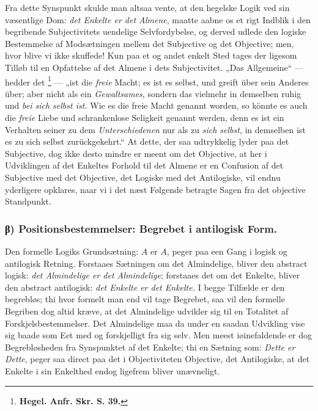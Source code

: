 \documentclass[11pt]{book}
\newcommand{\opage}[1]{\marginnote{\footnotesize\textit{[#1]}}}
\begin{document}
Fra dette Synspunkt skulde man altsaa vente, at den hegelske Logik ved
sin væsentlige Dom: \emph{det Enkelte er det Almene}, maatte aabne os
et rigt Indblik i den begribende Subjectivitets uendelige
Selvfordybelse, og derved udlede den logiske Bestemmelse af
Modsætningen mellem det Subjective og det Objective; men, hvor blive
vi ikke skuffede! Kun paa et og andet enkelt Sted tages der ligesom
Tilløb til en Opfattelse af det Almene i dets Subjectivitet. „Das
Allgemeine“ --- hedder det%
\footnote{%
\textbf{Hegel. Anfr. Skr. S. 39.}} --- „ist die \emph{freie} Macht; es
ist es selbst, und greift über sein Anderes über; aber nicht als ein
\emph{Gewaltsames}, sondern das vielmehr in demselben ruhig und
\emph{bei sich selbst ist.} Wie es die freie Macht genannt worden, so
könnte es auch die \emph{freie} Liebe und schrankenlose Seligkeit
genannt werden, denn es ist ein Verhalten seiner zu dem
\emph{Unterschiedenen} nur als zu \emph{sich selbst}, in demselben ist
es zu sich selbst zurückgekehrt.“ At dette, der saa udtrykkelig lyder
paa det Subjective, dog ikke desto mindre er meent om det Objective,
at her i Udviklingen af det Enkeltes Forhold til det Almene er en
Confusion af det Subjective med det Objective, det Logiske med det
Antilogiske, vil endnu yderligere opklares, naar vi i det næst
Følgende betragte Sagen fra det objective Standpunkt.

\subsubsection*{β) Positionsbestemmelser: Begrebet i antilogisk Form.}

Den formelle Logiks Grundsætning: $A$ er $A$, peger paa een Gang i
logisk og antilogisk Retning. Forstaaes Sætningen
\opage{156} \setcounter{footnote}{0}%
om det Almindelige, bliver den abstract logisk: \emph{det Almindelige
er det Almindelige}; forstaaes det om det Enkelte, bliver den abstract
antilogisk: \emph{det Enkelte er det Enkelte.} I begge Tilfælde er den
begrebløs; thi hvor formelt man end vil tage Begrebet, saa vil den
formelle Begriben dog altid kræve, at det Almindelige udvikler sig til
en Totalitet af Forskjelsbestemmelser. Det Almindelige maa da under en
saadan Udvikling vise sig baade som Eet med og forskjelligt fra sig
selv. Men meest iøinefaldende er dog Begrebløsheden fra Synspunktet af
det Enkelte; thi en Sætning som: \emph{Dette er Dette}, peger saa
direct paa det i Objectiviteten Objective, det Antilogiske, at det
Enkelte i sin Enkelthed endog ligefrem bliver unævneligt.
\end{document}
